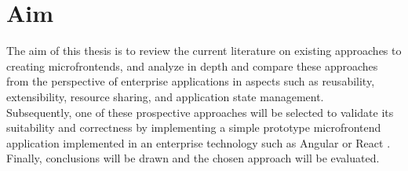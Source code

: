 \section{Aim}
The aim of this thesis is to review the current literature on existing approaches to creating microfrontends, and analyze in depth and compare these approaches from the perspective of enterprise applications in aspects such as reusability, extensibility, resource sharing, and application state management. \\

\noindent
Subsequently, one of these prospective approaches will be selected to validate its suitability and correctness by implementing a simple prototype microfrontend application implemented in an enterprise technology such as Angular \cite{Angular} or React \cite{React}. Finally, conclusions will be drawn and the chosen approach will be evaluated.